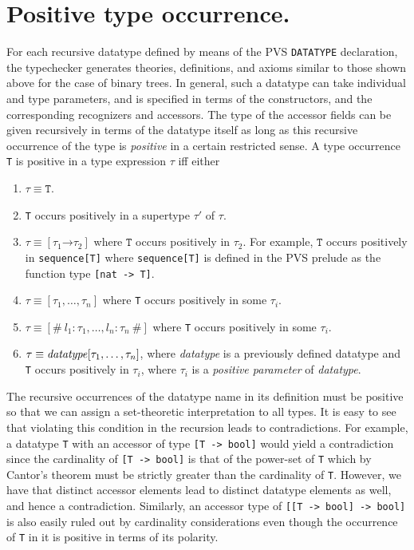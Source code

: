\documentclass[11pt,twoside]{book}
\newcommand{\tfuntype}[2]{[#1 -> #2]}
\newcommand{\mathfuntype}[2]{[#1 \aro #2]}
\newcommand{\aro}{\mathord\rightarrow} %
\begin{document}
\section{Positive type occurrence. }\label{positive}
For each recursive datatype defined by means of the PVS \texttt{DATATYPE}
declaration, the typechecker generates theories, definitions, and axioms
similar to those shown above for the case of binary trees.  In general,
such a datatype can take individual and type parameters, and
is specified in terms of the constructors, and the corresponding
recognizers and accessors.  The type of the accessor fields can be
given recursively in terms of the datatype itself as long as this
recursive occurrence of the type is \emph{positive} in a certain
restricted sense\@.  A type occurrence
\texttt{T} is positive in a type expression $\tau$ iff either
\begin{enumerate}
\item $\tau\equiv \texttt{T}$.

\item \texttt{T} occurs positively in a supertype $\tau'$  of $\tau$.

\item $\tau\equiv \mathfuntype{\tau_1}{\tau_2}$ where
$ \texttt{T}$ occurs positively
in $\tau_2$\@.  For example,  $\texttt{T}$ occurs positively in 
\texttt{sequence[T]} where \texttt{sequence[T]} is defined in the
PVS prelude as the function type \texttt{[nat -> T]}\@.

\item $\tau \equiv [\tau_1,\ldots, \tau_n]$ where \texttt{T} occurs
positively in some $\tau_i$.


\item $\tau\equiv [\#\ l_1 : \tau_1, \ldots, l_n : \tau_n\ \#]$ where
\texttt{T} occurs positively in some $\tau_i$\@. 

\item $\tau\equiv \mbox{\emph{datatype}}[\tau_1,\ldots, \tau_n]$,
where \emph{datatype} is a previously defined datatype 
and  \texttt{T} occurs positively in $\tau_i$, where
$\tau_i$ is a \emph{positive parameter} of  \emph{datatype}\@. 
\end{enumerate}


The recursive occurrences of the datatype name in its definition must be
positive so that we can assign a set-theoretic interpretation to all
types.  It is easy to see that violating this condition in the recursion
leads to contradictions.  For example, a datatype \texttt{T} with an
accessor of type \texttt{\tfuntype{T}{bool}} would yield a contradiction
since the cardinality of \texttt{\tfuntype{T}{bool}} is that of the
power-set of \texttt{T} which by Cantor's theorem must be strictly greater
than the cardinality of \texttt{T}\@.  However, we have that distinct
accessor elements lead to distinct datatype elements as well, and hence a
contradiction.  Similarly, an accessor type of
\texttt{\tfuntype{\tfuntype{T}{bool}}{bool}} is also easily ruled out by
cardinality considerations even though the occurrence of \texttt{T} in it
is positive in terms of its polarity.
\end{document}
